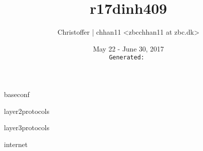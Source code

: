 \documentclass[a4paper,12pt,twoside,twocolumn,landscape]{book}
\begin{document}

\title{r17dinh409}
\author{Christoffer | chhan11 <zbcchhan11 at zbc.dk>}
\date{May 22 - June 30, 2017\\%
	{\tiny\texttt{Generated: \utccurrenttime}}}

\maketitle

\tableofcontents

\setlength{\parskip}{0.35em} %
\renewcommand{\baselinestretch}{1.15} %

	
{baseconf}

{layer2protocols}

{layer3protocols}

{internet}


\renewcommand{\listfigurename}{List of {\footnotesize hidden} Figures}
\listoffigures


\renewcommand{\listtablename}{Tables {\footnotesize hidding} on the pages}
\listoftables




\end{document}
